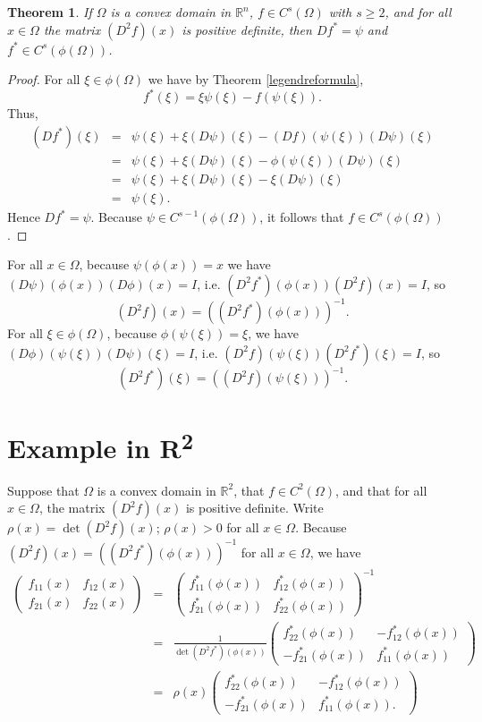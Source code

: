 \documentclass{article}
\newtheorem{theorem}{Theorem}
\theoremstyle{definition}
\begin{document}
\begin{theorem}
If $\Omega$ is a convex domain in $\mathbb{R}^n$, $f \in C^s(\Omega)$ with $s \geq 2$, and for all $x \in \Omega$ the matrix
$(D^2 f)(x)$ is positive definite, then $Df^*=\psi$ and $f^* \in C^s(\phi(\Omega))$.
\end{theorem}
\begin{proof}
For all $\xi \in \phi(\Omega)$ we have by Theorem \ref{legendreformula},
\[
f^*(\xi) = \xi  \psi(\xi) -f(\psi(\xi)).
\]
Thus,
\begin{eqnarray*}
(D f^*)(\xi) &=& \psi(\xi) +\xi (D \psi)(\xi) -(Df)(\psi(\xi)) (D\psi)(\xi)\\
&=&\psi(\xi) + \xi (D\psi)(\xi) - \phi(\psi(\xi)) (D\psi)(\xi)\\
&=&\psi(\xi) + \xi (D\psi)(\xi) -\xi(D\psi)(\xi)\\
&=&\psi(\xi).
\end{eqnarray*}
Hence $Df^*=\psi$. Because $\psi \in C^{s-1}(\phi(\Omega))$, it follows that $f \in C^s(\phi(\Omega))$.
\end{proof}

For all $x \in \Omega$, because $\psi(\phi(x))=x$ we have $(D\psi)(\phi(x)) (D\phi)(x) = I$, i.e. $(D^2 f^*)(\phi(x)) (D^2 f)(x) = I$, so
\[
(D^2f)(x)=((D^2 f^*)(\phi(x)))^{-1}.
\]
For all $\xi \in \phi(\Omega)$, because $\phi(\psi(\xi))=\xi$, we have $(D\phi)(\psi(\xi)) (D\psi)(\xi)=I$, i.e. $(D^2 f)(\psi(\xi)) (D^2 f^*)(\xi)=I$, so
\[
(D^2 f^*)(\xi) = ((D^2 f)(\psi(\xi)))^{-1}.
\]



\section{Example in \textbf{R}\textsuperscript{2}}
Suppose that $\Omega$ is a convex domain in $\mathbb{R}^2$, that $f \in C^2(\Omega)$, and that for all $x \in \Omega$, the matrix $(D^2 f)(x)$ is positive definite.
Write $\rho(x)=\det (D^2 f)(x)$; $\rho(x)>0$ for all $x \in \Omega$.  
Because $(D^2 f)(x) = ((D^2 f^*)(\phi(x)))^{-1}$ for all $x \in \Omega$, we have
\begin{eqnarray*}
\begin{pmatrix}
f_{11}(x)&f_{12}(x)\\
f_{21}(x)&f_{22}(x)
\end{pmatrix}
&=&\begin{pmatrix}
f^*_{11}(\phi(x))&f^*_{12}(\phi(x))\\
f^*_{21}(\phi(x))&f^*_{22}(\phi(x))
\end{pmatrix}^{-1}\\
&=&
\frac{1}{\det (D^2 f^*)(\phi(x))} \begin{pmatrix}f^*_{22}(\phi(x))&-f^*_{12}(\phi(x))\\
-f^*_{21}(\phi(x))&f^*_{11}(\phi(x))
\end{pmatrix}\\
&=&
\rho(x) \begin{pmatrix}f^*_{22}(\phi(x))&-f^*_{12}(\phi(x))\\
-f^*_{21}(\phi(x))&f^*_{11}(\phi(x)).
\end{pmatrix}
\end{eqnarray*}
\end{document}
